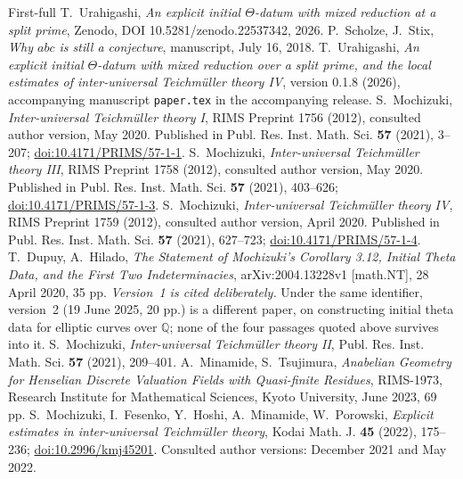 \documentclass[11pt]{article}
\theoremstyle{plain}
\theoremstyle{definition}
\begin{document}
\begin{thebibliography}{First-full}
 T.~Urahigashi, \emph{An explicit initial $\Theta$-datum with
 mixed reduction at a split prime}, Zenodo, DOI 10.5281/zenodo.22537342, 2026.
 P.~Scholze, J.~Stix, \emph{Why $abc$ is still a conjecture},
 manuscript, July 16, 2018.
 T.~Urahigashi,
\emph{An explicit initial $\Theta$-datum with mixed reduction over a split prime,
and the local estimates of inter-universal Teichm\"uller theory IV},
version 0.1.8 (2026), accompanying manuscript
\texttt{paper.tex} in the accompanying release.
 S.~Mochizuki,
\emph{Inter-universal Teichm\"uller theory I}, RIMS Preprint 1756 (2012),
consulted author version, May 2020.
Published in Publ. Res. Inst. Math. Sci. \textbf{57} (2021), 3--207;
\href{https://doi.org/10.4171/PRIMS/57-1-1}{doi:10.4171/PRIMS/57-1-1}.
 S.~Mochizuki,
\emph{Inter-universal Teichm\"uller theory III}, RIMS Preprint 1758 (2012),
consulted author version, May 2020.
Published in Publ. Res. Inst. Math. Sci. \textbf{57} (2021), 403--626;
\href{https://doi.org/10.4171/PRIMS/57-1-3}{doi:10.4171/PRIMS/57-1-3}.
 S.~Mochizuki,
\emph{Inter-universal Teichm\"uller theory IV}, RIMS Preprint 1759 (2012),
consulted author version, April 2020.
Published in Publ. Res. Inst. Math. Sci. \textbf{57} (2021), 627--723;
\href{https://doi.org/10.4171/PRIMS/57-1-4}{doi:10.4171/PRIMS/57-1-4}.
 T.~Dupuy, A.~Hilado, \emph{The Statement of Mochizuki's Corollary
 3.12, Initial Theta Data, and the First Two Indeterminacies}, arXiv:2004.13228v1
 [math.NT], 28 April 2020, 35 pp.  \emph{Version~1 is cited deliberately.}  Under the
 same identifier, version~2 (19 June 2025, 20 pp.) is a different paper, on
 constructing initial theta data for elliptic curves over $\mathbb{Q}$; none of the
 four passages quoted above survives into it.
 S.~Mochizuki, \emph{Inter-universal Teichm\"uller theory II},
 Publ. Res. Inst. Math. Sci. \textbf{57} (2021), 209--401.
 A.~Minamide, S.~Tsujimura, \emph{Anabelian Geometry for Henselian
 Discrete Valuation Fields with Quasi-finite Residues}, RIMS-1973, Research Institute
 for Mathematical Sciences, Kyoto University, June 2023, 69 pp.
 S.~Mochizuki, I.~Fesenko, Y.~Hoshi, A.~Minamide,
W.~Porowski, \emph{Explicit estimates in inter-universal Teichm\"uller theory},
Kodai Math. J. \textbf{45} (2022), 175--236;
\href{https://doi.org/10.2996/kmj45201}{doi:10.2996/kmj45201}.
Consulted author versions: December 2021 and May 2022.

\end{thebibliography}
\end{document}
